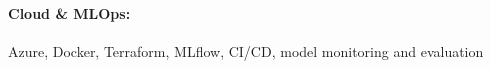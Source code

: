 \documentclass[10pt, letterpaper]{article}
\newenvironment{highlights}{
    \begin{itemize}[
        topsep=0.10 cm,
        parsep=0.10 cm,
        partopsep=0pt,
        itemsep=0pt,
        leftmargin=0 cm + 10pt
    ]
}{
    \end{itemize}
} %
\newenvironment{onecolentry}{
    \begin{adjustwidth}{
        0 cm + 0.00001 cm
    }{
        0 cm + 0.00001 cm
    }
}{
    \end{adjustwidth}
} %
\begin{document}
        \paragraph{Cloud \& MLOps:} Azure, Docker, Terraform, MLflow, CI/CD, model monitoring and evaluation

    
        



    
    
    


    
\end{document}
